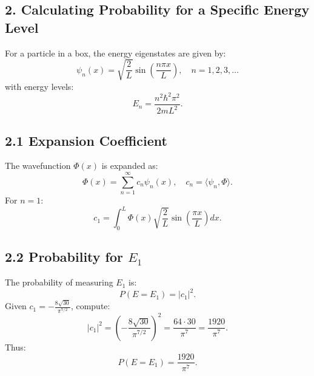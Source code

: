 \documentclass[a4paper,12pt]{article}
\begin{document}
\begin{multicols}{2}
\section*{2. Calculating Probability for a Specific Energy Level}
For a particle in a box, the energy eigenstates are given by:
\[
\psi_n(x) = \sqrt{\frac{2}{L}} \sin\left(\frac{n\pi x}{L}\right), \quad n = 1, 2, 3, \dots
\]
with energy levels:
\[
E_n = \frac{n^2 \hbar^2 \pi^2}{2mL^2}.
\]

\subsection*{2.1 Expansion Coefficient}
The wavefunction $\Phi(x)$ is expanded as:
\[
\Phi(x) = \sum_{n=1}^\infty c_n \psi_n(x), \quad c_n = \langle \psi_n, \Phi \rangle.
\]
For $n=1$:
\[
c_1 = \int_0^L \Phi(x) \sqrt{\frac{2}{L}} \sin\left(\frac{\pi x}{L}\right) dx.
\]

\subsection*{2.2 Probability for $E_1$}
The probability of measuring $E_1$ is:
\[
P(E = E_1) = |c_1|^2.
\]
Given $c_1 = -\frac{8\sqrt{30}}{\pi^{7/2}}$, compute:
\[
|c_1|^2 = \left(-\frac{8\sqrt{30}}{\pi^{7/2}}\right)^2 = \frac{64 \cdot 30}{\pi^7} = \frac{1920}{\pi^7}.
\]
Thus:
\[
P(E = E_1) = \frac{1920}{\pi^7}.
\]
\end{multicols}
\end{document}
